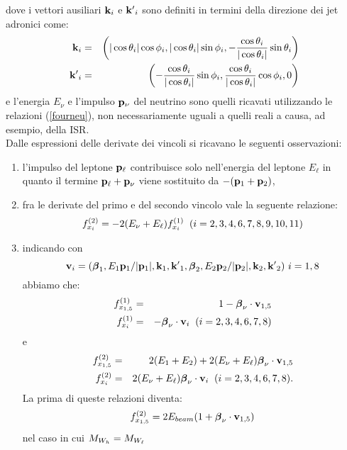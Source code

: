 dove i vettori ausiliari ${\bf k}_i$ e ${\bf k^\prime}_i$ sono definiti in termini
della direzione dei jet adronici come:
\begin{eqnarray*}
{\bf k}_i&=&\left(|\cos\theta_i|\cos\phi_i, |\cos\theta_i|\sin\phi_i,-\frac{\cos\theta_i}{|\cos\theta_i|}\sin\theta_i\right)\\
{\bf k^\prime}_i&=&\left(-\frac{\cos\theta_i}{|\cos\theta_i|}\sin\phi_i, \frac{\cos\theta_i}{|\cos\theta_i|}\cos\phi_i,0\right)
\end{eqnarray*}
e l'energia $E_\nu$ e l'impulso ${\bf p}_\nu$ del neutrino sono quelli ricavati utilizzando le relazioni (\ref{fourneu}), non necessariamente uguali a quelli reali a causa, ad esempio, della ISR.\\
Dalle espressioni delle derivate dei vincoli si ricavano le seguenti osservazioni:
\begin{enumerate}
\item l'impulso del leptone ${\bf p}_\ell$ contribuisce solo nell'energia del leptone $E_\ell$ in quanto il termine ${\bf p}_\ell+{\bf p}_\nu$ viene sostituito da $-({\bf p}_1+{\bf p}_2)$,
\item fra le derivate del primo e del secondo vincolo vale la seguente relazione:
\begin{equation}
\label{ftwovsfone}
f^{(2)}_{x_i}=-2(E_\nu+E_\ell)f^{(1)}_{x_i}\;\;(i=2,3,4,6,7,8,9,10,11)
\end{equation}
\item indicando con 
\begin{equation}
\label{auxvect}
{\bf v}_i=(\betaone,E_1\bfp_1/|\bfp_1|,{\bf k}_1,{\bf k^\prime}_1,\betatwo,E_2\bfp_2/|\bfp_2|,{\bf k}_2,{\bf k^\prime}_2)\ i=1,8
\end{equation}
abbiamo che:
\begin{eqnarray*}
f^{(1)}_{x_{1,5}}&=&1-\mbox{\boldmath $\beta$}_\nu\cdot{\bf v}_{1,5}\\
f^{(1)}_{x_i}&=&-\mbox{\boldmath $\beta$}_\nu\cdot{\bf v}_i\;\;(i=2,3,4,6,7,8)
\end{eqnarray*}
e
\begin{eqnarray*}
f^{(2)}_{x_{1,5}}&=&2(E_1+E_2)+2(E_\nu+E_\ell)\mbox{\boldmath $\beta$}_\nu\cdot{\bf v}_{1,5}\\
f^{(2)}_{x_i}&=&2(E_\nu+E_\ell)\mbox{\boldmath $\beta$}_\nu\cdot{\bf v}_i\;\;(i=2,3,4,6,7,8).
\end{eqnarray*}
La prima di queste relazioni diventa:\[f^{(2)}_{x_{1,5}}=2E_{beam}(1+\mbox{\boldmath $\beta$}_\nu\cdot{\bf v}_{1,5})\]
nel caso in cui $M_{W_h}=M_{W_\ell}$\end{enumerate}
%

